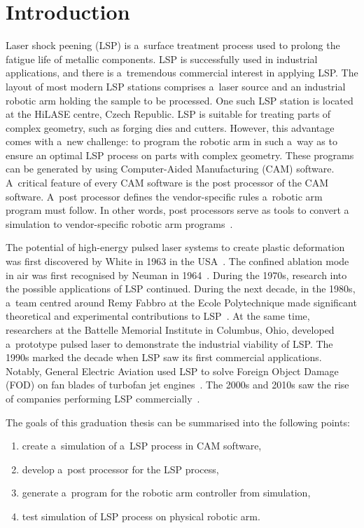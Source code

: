 \chapter{Introduction \label{ch:uvod}}




Laser shock peening (LSP) is a~surface treatment process used to prolong the fatigue life of metallic components. LSP is successfully used in industrial applications, and there is a~tremendous commercial interest in applying LSP. The layout of most modern LSP stations comprises a~laser source and an industrial robotic arm holding the sample to be processed. One such LSP station is located at the HiLASE centre, Czech Republic. LSP is suitable for treating parts of complex geometry, such as forging dies and cutters. However, this advantage comes with a~new challenge: to program the robotic arm in such a~way as to ensure an optimal LSP process on parts with complex geometry. These programs can be generated by using Computer-Aided Manufacturing (CAM) software. A~critical feature of every CAM software is the post processor of the CAM software. A~post processor defines the \mbox{vendor-specific} rules a~robotic arm program must follow.  In other words, post processors serve as tools to convert a simulation to vendor-specific robotic arm programs~\cite{ding_ye_2006}.

The potential of high-energy pulsed laser systems to create plastic deformation was first discovered by White in 1963 in the USA~\cite{white_1963}. The confined ablation mode in air was first recognised by Neuman in 1964~\cite{neuman_1964}. During the 1970s, research into the possible applications of LSP continued. During the next decade, in the 1980s, a~team centred around Remy Fabbro at the Ecole Polytechnique made significant theoretical and experimental contributions to LSP~\cite{fabbro_fournier_ballard_devaux_virmont_1990}. At the same time, researchers at the Battelle Memorial Institute in Columbus, Ohio, developed a~prototype pulsed laser to demonstrate the industrial viability of LSP. The 1990s marked the decade when LSP saw its first commercial applications. Notably, General Electric Aviation used LSP to solve Foreign Object Damage (FOD) on fan blades of turbofan jet engines~\cite{airforce}. The 2000s and 2010s saw the rise of companies performing LSP commercially~\cite{sano}.

The goals of this graduation thesis can be summarised into the following points:
\begin{enumerate}

    \item create a~simulation of a~LSP process in CAM software,
    \item develop a~post processor for the LSP process, 
    \item generate a~program  for the robotic arm controller from simulation,
    \item test simulation of LSP process on physical robotic arm.

    
\end{enumerate}

